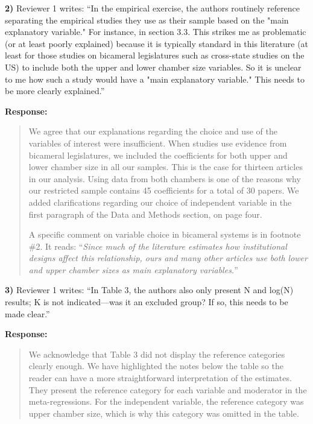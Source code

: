 \documentclass[a4paper,12pt]{article}
\begin{document}
\vspace{.3cm}

\noindent \textbf{2)} Reviewer 1 writes: ``In the empirical exercise, the authors routinely reference separating the empirical studies they use as their sample based on the "main explanatory variable." For instance, in section 3.3. This strikes me as problematic (or at least poorly explained) because it is typically standard in this literature (at least for those studies on bicameral legislatures such as cross-state studies on the US) to include both the upper and lower chamber size variables. So it is unclear to me how such a study would have a "main explanatory variable." This needs to be more clearly explained.''

\vspace{.3cm}

\noindent \textbf{Response:} 
\begin{quote}
    We agree that our explanations regarding the choice and use of the variables of interest were insufficient. When studies use evidence from bicameral legislatures, we included the coefficients for both upper and lower chamber size in all our samples. This is the case for thirteen articles in our analysis. Using data from both chambers is one of the reasons why our restricted sample contains 45 coefficients for a total of 30 papers. We added clarifications regarding our choice of independent variable in the first paragraph of the Data and Methods section, on page four.
    
    A specific comment on variable choice in bicameral systems is in footnote \#2. It reads: ``\textit{Since much of the literature estimates how institutional designs affect this relationship, ours and many other articles use both lower and upper chamber sizes as main explanatory variables.}''
\end{quote}

\vspace{.3cm}

\noindent \textbf{3)} Reviewer 1 writes: ``In Table 3, the authors also only present N and log(N) results; K is not indicated—was it an excluded group? If so, this needs to be made clear.''

\vspace{.3cm}

\noindent \textbf{Response:} 
\begin{quote}
    We acknowledge that Table 3 did not display the reference categories clearly enough. We have highlighted the notes below the table so the reader can have a more straightforward interpretation of the estimates. They present the reference category for each variable and moderator in the meta-regressions. For the independent variable, the reference category was upper chamber size, which is why this category was omitted in the table.
\end{quote}
\end{document}
